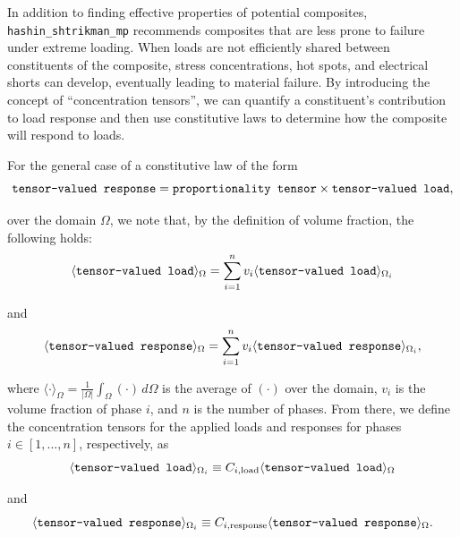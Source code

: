 In addition to finding effective properties of potential composites,
\texttt{hashin\_shtrikman\_mp} recommends composites that are less prone
to failure under extreme loading. When loads are not efficiently shared
between constituents of the composite, stress concentrations, hot spots,
and electrical shorts can develop, eventually leading to material
failure. By introducing the concept of ``concentration tensors'', we can
quantify a constituent's contribution to load response and then use
constitutive laws to determine how the composite will respond to loads.

For the general case of a constitutive law of the form
\begin{equation}\label{eqn:gen-const-law}
\verb|tensor-valued response| = \verb|proportionality tensor| \times \verb|tensor-valued load|,
\end{equation}

over the domain \(\Omega\), we note that, by the definition of volume
fraction, the following holds:
\begin{equation}\label{eqn:by-vol-frac-load}
\langle \verb|tensor-valued load| \rangle_{\Omega} = \sum\limits_{i=1}^{n} v_{i} \langle \verb|tensor-valued load| \rangle_{\Omega_{i}}
\end{equation}

and \begin{equation}\label{eqn:by-vol-frac-resp}
\langle \verb|tensor-valued response| \rangle_{\Omega} = \sum\limits_{i=1}^{n} v_{i} \langle \verb|tensor-valued response| \rangle_{\Omega_{i}},
\end{equation}

where
\(\langle \cdot \rangle_{\Omega} = \frac{1}{|\Omega|} \int_{\Omega} (\cdot) \,d\Omega\)
is the average of \((\cdot)\) over the domain, \(v_{i}\) is the volume
fraction of phase \(i\), and \(n\) is the number of phases. From there,
we define the concentration tensors for the applied loads and responses
for phases \(i\in[1,...,n]\), respectively, as
\begin{equation}\label{eqn:Cload-basic-def}
\langle \verb|tensor-valued load| \rangle_{\Omega_{i}} \equiv C_{i, \text{load}} \langle \verb|tensor-valued load| \rangle_{\Omega}
\end{equation}

and \begin{equation}\label{eqn:Cresp-basic-def}
\langle \verb|tensor-valued response| \rangle_{\Omega_{i}} \equiv C_{i, \text{response}} \langle \verb|tensor-valued response| \rangle_{\Omega}.
\end{equation}

